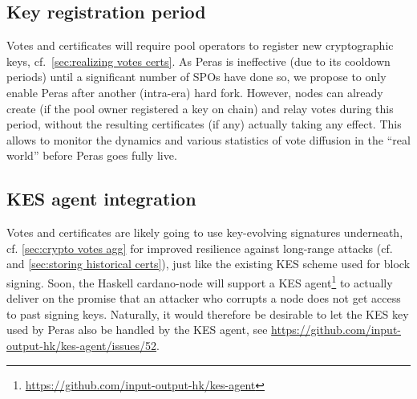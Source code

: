 \subsection{Key registration period}

Votes and certificates will require pool operators to register new cryptographic keys, cf.\ \cref{sec:realizing votes certs}.
As Peras is ineffective (due to its cooldown periods) until a significant number of SPOs have done so, we propose to only enable Peras after another (intra-era) hard fork.
However, nodes can already create (if the pool owner registered a key on chain) and relay votes during this period, without the resulting certificates (if any) actually taking any effect.
This allows to monitor the dynamics and various statistics of vote diffusion in the \enquote{real world} before Peras goes fully live.

\subsection{KES agent integration}

Votes and certificates are likely going to use key-evolving signatures underneath, cf. \cref{sec:crypto votes agg} for improved resilience against long-range attacks (cf.\ \cite{david2018ouroboros} and \cref{sec:storing historical certs}), just like the existing KES scheme used for block signing.
Soon, the Haskell cardano-node will support a KES agent\footnote{\url{https://github.com/input-output-hk/kes-agent}} to actually deliver on the promise that an attacker who corrupts a node does not get access to past signing keys.
Naturally, it would therefore be desirable to let the KES key used by Peras also be handled by the KES agent, see \url{https://github.com/input-output-hk/kes-agent/issues/52}.

